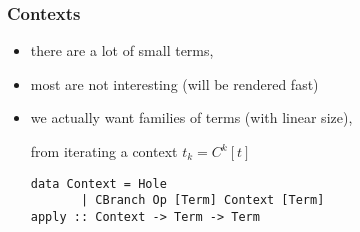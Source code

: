 
\begin{frame}[fragile]
\frametitle{Contexts}

  \begin{itemize}[<+->]
  \item there are a lot of small terms,
  \item most are not interesting (will be rendered fast)
  \item we actually want families of terms
    (with linear size), 

    from iterating a context $t_k=C^k[t]$
\begin{verbatim}
data Context = Hole
       | CBranch Op [Term] Context [Term]
apply :: Context -> Term -> Term
\end{verbatim}

  \end{itemize}

\end{frame}
